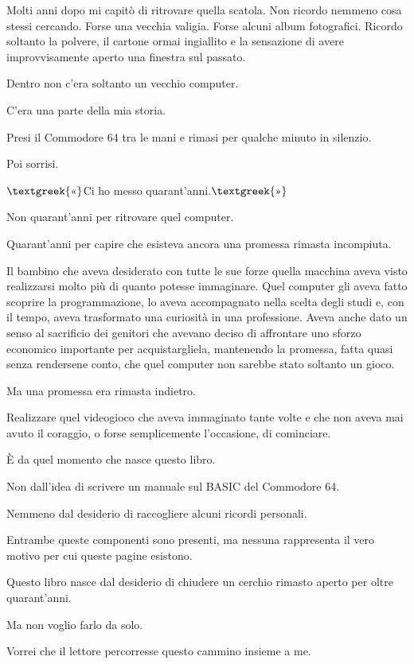 \documentclass{article}
\begin{document}
Molti anni dopo mi capitò di ritrovare quella scatola. Non ricordo nemmeno cosa stessi cercando. Forse una vecchia
valigia. Forse alcuni album fotografici. Ricordo soltanto la polvere, il cartone ormai ingiallito e la sensazione di
avere improvvisamente aperto una finestra sul passato.

Dentro non c'era soltanto un vecchio computer.

C'era una parte della mia storia.

Presi il Commodore 64 tra le mani e rimasi per qualche minuto in silenzio.

Poi sorrisi.

$\text{\textgreek{«}}$Ci ho messo quarant'anni.$\text{\textgreek{»}}$

Non quarant'anni per ritrovare quel computer.

Quarant'anni per capire che esisteva ancora una promessa rimasta incompiuta.

Il bambino che aveva desiderato con tutte le sue forze quella macchina aveva visto realizzarsi molto più di quanto
potesse immaginare. Quel computer gli aveva fatto scoprire la programmazione, lo aveva accompagnato nella scelta degli
studi e, con il tempo, aveva trasformato una curiosità in una professione. Aveva anche dato un senso al sacrificio dei
genitori che avevano deciso di affrontare uno sforzo economico importante per acquistargliela, mantenendo la promessa,
fatta quasi senza rendersene conto, che quel computer non sarebbe stato soltanto un gioco.

Ma una promessa era rimasta indietro.

Realizzare quel videogioco che aveva immaginato tante volte e che non aveva mai avuto il coraggio, o forse semplicemente
l'occasione, di cominciare.

È da quel momento che nasce questo libro.

Non dall'idea di scrivere un manuale sul BASIC del Commodore 64.

Nemmeno dal desiderio di raccogliere alcuni ricordi personali.

Entrambe queste componenti sono presenti, ma nessuna rappresenta il vero motivo per cui queste pagine esistono.

Questo libro nasce dal desiderio di chiudere un cerchio rimasto aperto per oltre quarant'anni.

Ma non voglio farlo da solo.

Vorrei che il lettore percorresse questo cammino insieme a me.
\end{document}

